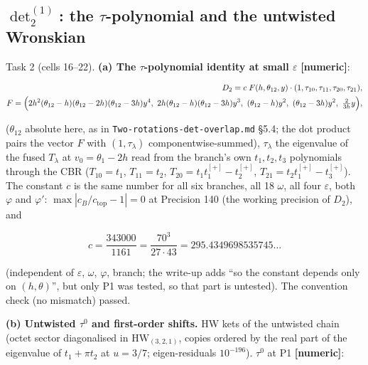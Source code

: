\documentclass[10pt]{article}
\newcommand{\nb}[1]{\texttt{#1}}
\begin{document}
\subsection{$\det_2^{(1)}$: the $\tau$-polynomial and the untwisted Wronskian}\label{sec:detsdet2}

Task 2 (cells 16--22). \textbf{(a) The $\tau$-polynomial identity at small $\varepsilon$} \textbf{[numeric]}:

\[\begin{aligned}
D_2=c\;F(h,\theta_{12},y)\cdot(1,\tau_{10},\tau_{11},\tau_{20},\tau_{21}),\\
F=\Bigl(2h^2(\theta_{12}-h)(\theta_{12}-2h)(\theta_{12}-3h)y^4,\ 2h(\theta_{12}-h)(\theta_{12}-3h)y^3,\ (\theta_{12}-h)y^2,\ (\theta_{12}-3h)y^2,\ \tfrac{2}{3h}y\Bigr),
\end{aligned}\]

($\theta_{12}$ absolute here, as in \nb{Two-\allowbreak{}rotations-\allowbreak{}det-\allowbreak{}overlap.\allowbreak{}md} \S{}5.4; the dot product pairs the vector $F$ with $(1,\tau_\lambda)$ componentwise-summed), $\tau_\lambda$ the eigenvalue of the fused $T_\lambda$ at $v_0=\theta_1-2h$ read from the branch's own $t_1,t_2,t_3$ polynomials through the CBR ($T_{10}=t_1$, $T_{11}=t_2$, $T_{20}=t_1t_1^{[+]}-t_2^{[+]}$, $T_{21}=t_2t_1^{[+]}-t_3^{[+]}$). The constant $c$ is the same number for all six branches, all 18 $\omega$, all four $\varepsilon$, both $\varphi$ and $\varphi'$: $\max|c_B/c_{\mathrm{top}}-1|=0$ at Precision 140 (the working precision of $D_2$), and

\[
c=\frac{343000}{1161}=\frac{70^3}{27\cdot43}=295.4349698535745\ldots
\]

(independent of $\varepsilon$, $\omega$, $\varphi$, branch; the write-up adds ``so the constant depends only on $(h,\theta)$'', but only P1 was tested, so that part is untested). The convention check (no mismatch) passed.

\textbf{(b) Untwisted $\tau^0$ and first-order shifts.} HW kets of the untwisted chain (octet sector diagonalised in $\mathrm{HW}_{(3,2,1)}$, copies ordered by the real part of the eigenvalue of $t_1+\pi t_2$ at $u=3/7$; eigen-residuals $10^{-196}$). $\tau^0$ at P1 \textbf{[numeric]}:
\end{document}
